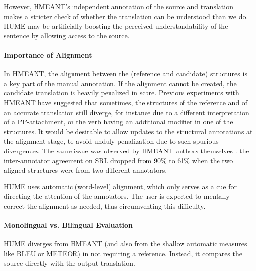\documentclass[11pt]{article}
\def\parcite#1{\cite{#1}}
\begin{document}
However, HMEANT's independent annotation of the source and translation makes a stricter check
of whether the translation can be understood
than we do. HUME may be artificially boosting the perceived understandability of
the sentence by allowing access to the source.

\paragraph{Importance of Alignment}

In HMEANT, the alignment between the (reference and candidate) structures is a key
part of the manual annotation. If the alignment cannot be created, the candidate
translation is heavily penalized in score.
Previous experiments with HMEANT
\parcite{bojar:wu:ssst:2012,chuchunkov-tarelkin-galinskaya:2014:SSST-8} have
suggested that sometimes, the structures of the reference and of an accurate translation
still diverge, for instance due to a different
interpretation of a PP-attachment, or the verb having an additional modifier in
one of the structures. It would be desirable to allow updates to the structural
annotations at the alignment stage,
to avoid unduly penalization due to such spurious divergences.
The same issue was observed by HMEANT authors themselves
\parcite{lo:wu:reliability:2014}:
the 
inter-annotator agreement on SRL dropped from 90\% to 61\% 
when the two aligned structures were from two different annotators.

HUME uses automatic (word-level) alignment, which only
serves as a cue for directing the attention of the annotators.
The user is expected to mentally correct the
alignment as needed, thus circumventing this difficulty.



\paragraph{Monolingual vs. Bilingual Evaluation}
\label{src-vs-ref}
HUME diverges from HMEANT (and also from the shallow automatic measures
like BLEU or METEOR) in not requiring a reference.
Instead, it compares the source directly with the output translation.
\end{document}
